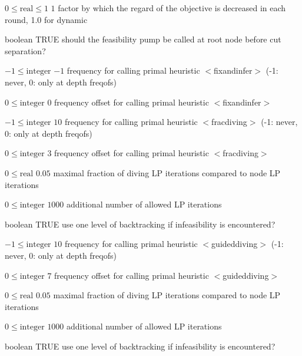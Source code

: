%
{$0\leq\textrm{real}\leq1$}%
{$1$}%
{factor by which the regard of the objective is decreased in each round, 1.0 for dynamic}%
{}

%
{boolean}%
{TRUE}%
{should the feasibility pump be called at root node before cut separation?}%
{}

%
{$-1\leq\textrm{integer}$}%
{$-1$}%
{frequency for calling primal heuristic $<$fixandinfer$>$ (-1: never, 0: only at depth freqofs)}%
{}

%
{$0\leq\textrm{integer}$}%
{$0$}%
{frequency offset for calling primal heuristic $<$fixandinfer$>$}%
{}

%
{$-1\leq\textrm{integer}$}%
{$10$}%
{frequency for calling primal heuristic $<$fracdiving$>$ (-1: never, 0: only at depth freqofs)}%
{}

%
{$0\leq\textrm{integer}$}%
{$3$}%
{frequency offset for calling primal heuristic $<$fracdiving$>$}%
{}

%
{$0\leq\textrm{real}$}%
{$0.05$}%
{maximal fraction of diving LP iterations compared to node LP iterations}%
{}

%
{$0\leq\textrm{integer}$}%
{$1000$}%
{additional number of allowed LP iterations}%
{}

%
{boolean}%
{TRUE}%
{use one level of backtracking if infeasibility is encountered?}%
{}

%
{$-1\leq\textrm{integer}$}%
{$10$}%
{frequency for calling primal heuristic $<$guideddiving$>$ (-1: never, 0: only at depth freqofs)}%
{}

%
{$0\leq\textrm{integer}$}%
{$7$}%
{frequency offset for calling primal heuristic $<$guideddiving$>$}%
{}

%
{$0\leq\textrm{real}$}%
{$0.05$}%
{maximal fraction of diving LP iterations compared to node LP iterations}%
{}

%
{$0\leq\textrm{integer}$}%
{$1000$}%
{additional number of allowed LP iterations}%
{}

%
{boolean}%
{TRUE}%
{use one level of backtracking if infeasibility is encountered?}%
{}

